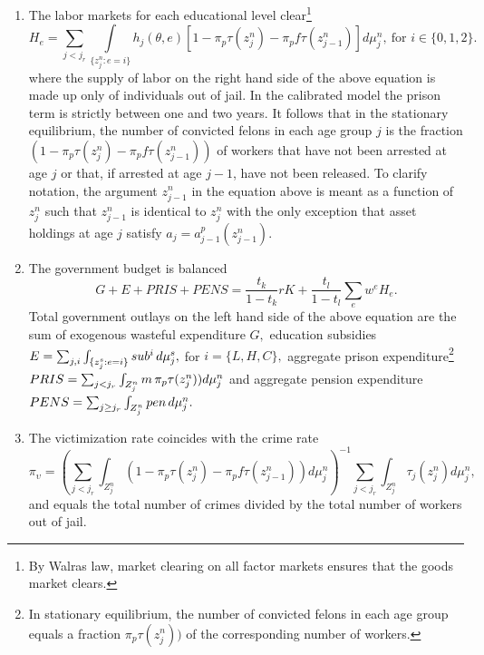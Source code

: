 \documentclass[a4paper,dvips,12pt]{article}
\begin{document}
\begin{enumerate}
\item The labor markets for each educational level clear\footnote{%
By Walras law, market clearing on all factor markets ensures that the goods
market clears.}
\begin{equation*}
H_{e}=\sum_{j<j_{r}}\int \limits_{\{z^{n}_{j}:e=i\}}h_{j}\left(
\theta,e\right)\left[1-\pi_{p}\tau(z^{n}_{j})-\pi_{p} f \tau(z^{n}_{j-1})\right] d\mu^{n}_{j},\ \text{for } i\in
\{0,1,2\}.
\end{equation*}
where the supply of labor on the right hand side of the above equation
is made up only of individuals out of jail. In the calibrated model the
prison term is strictly between one and two years. It follows that in
the stationary equilibrium, the number of
convicted felons in each age group $j$ is the fraction
$(1-\pi_{p}\tau(z^{n}_{j})-\pi_{p}f\tau(z^{n}_{j-1}))$ of workers that
have not been arrested at age $j$ or that, if arrested at age $j-1$, have not been released. To clarify notation, the argument $z^{n}_{j-1}$ in the equation above is meant as a function of $z^{n}_{j}$ such that $z^{n}_{j-1}$ is identical to $z^{n}_{j}$ with the only exception that asset holdings at age $j$ satisfy $a_{j}=a^{p}_{j-1}(z^{n}_{j-1})$.

\item The government budget is balanced
\begin{equation*}
G+E+PRIS+PENS =\frac{t_{k}}{1-t_{k}}rK+\frac{t_{l}}{1-t_{l}}\sum_{e} w^{e}H_{e}.
\end{equation*}
Total government outlays on the left hand side of the above equation are the
sum of exogenous wasteful expenditure $G,$ education subsidies $%
E=\sum_{j,i}\int_{\{z^{s}_{j}:e=i\}} sub^{i} \thinspace d\mu^{s}_{j},$ for $%
i=\{L,H,C\},$ aggregate prison expenditure\footnote{%
In stationary equilibrium, the number of convicted felons in each age group
equals a fraction $\pi_{p}\tau(z^{n}_{j}))$ of the corresponding number of
workers.} $PRIS=\sum_{j<j_{r}}\int _{Z^{n}_{j}}m \thinspace
\pi_{p}\tau(z^{n}_{j})) d\mu^{n}_{j}$ and aggregate pension expenditure $%
PENS=\sum_{j\geq j_{r}}\int_{Z^{n}_{j}}pen\thinspace d\mu^{n}_{j}.$

\item The victimization rate coincides with the crime rate
\begin{equation*}
\pi_{\upsilon}=\left(\sum_{j<j_{r}} \int_{
Z^{n}_{j}}(1-\pi_{p}\tau(z^{n}_{j})-\pi_{p}f\tau(z^{n}_{j-1})) d\mu^{n}_{j} \right)
^{-1}\sum_{j<j_{r}}\int_{Z^{n}_{j}}\tau_{j}(z^{n}_{j}) d\mu^{n}_{j},
\end{equation*}
and equals the total number of crimes divided by the total number of workers
out of jail.


\end{enumerate}
\end{document}
